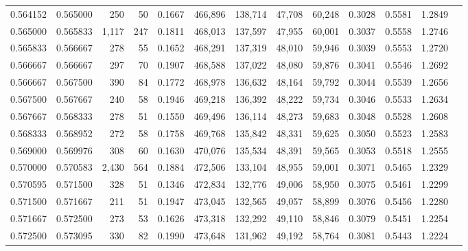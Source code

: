 \begin{tabular}{rrrrrrrrrrrrr}
0.564152 & 0.565000 &   250 &  50 &                                     0.1667 & 466,896 & 138,714 &  47,708 &  60,248 & 0.3028 & 0.5581 & 1.2849 \\
0.565000 & 0.565833 & 1,117 & 247 &                                     0.1811 & 468,013 & 137,597 &  47,955 &  60,001 & 0.3037 & 0.5558 & 1.2746 \\
0.565833 & 0.566667 &   278 &  55 &                                     0.1652 & 468,291 & 137,319 &  48,010 &  59,946 & 0.3039 & 0.5553 & 1.2720 \\
0.566667 & 0.566667 &   297 &  70 &                                     0.1907 & 468,588 & 137,022 &  48,080 &  59,876 & 0.3041 & 0.5546 & 1.2692 \\
0.566667 & 0.567500 &   390 &  84 &                                     0.1772 & 468,978 & 136,632 &  48,164 &  59,792 & 0.3044 & 0.5539 & 1.2656 \\
0.567500 & 0.567667 &   240 &  58 &                                     0.1946 & 469,218 & 136,392 &  48,222 &  59,734 & 0.3046 & 0.5533 & 1.2634 \\
0.567667 & 0.568333 &   278 &  51 &                                     0.1550 & 469,496 & 136,114 &  48,273 &  59,683 & 0.3048 & 0.5528 & 1.2608 \\
0.568333 & 0.568952 &   272 &  58 &                                     0.1758 & 469,768 & 135,842 &  48,331 &  59,625 & 0.3050 & 0.5523 & 1.2583 \\
0.569000 & 0.569976 &   308 &  60 &                                     0.1630 & 470,076 & 135,534 &  48,391 &  59,565 & 0.3053 & 0.5518 & 1.2555 \\
0.570000 & 0.570583 & 2,430 & 564 &                                     0.1884 & 472,506 & 133,104 &  48,955 &  59,001 & 0.3071 & 0.5465 & 1.2329 \\
0.570595 & 0.571500 &   328 &  51 &                                     0.1346 & 472,834 & 132,776 &  49,006 &  58,950 & 0.3075 & 0.5461 & 1.2299 \\
0.571500 & 0.571667 &   211 &  51 &                                     0.1947 & 473,045 & 132,565 &  49,057 &  58,899 & 0.3076 & 0.5456 & 1.2280 \\
0.571667 & 0.572500 &   273 &  53 &                                     0.1626 & 473,318 & 132,292 &  49,110 &  58,846 & 0.3079 & 0.5451 & 1.2254 \\
0.572500 & 0.573095 &   330 &  82 &                                     0.1990 & 473,648 & 131,962 &  49,192 &  58,764 & 0.3081 & 0.5443 & 1.2224 \\

\end{tabular}
